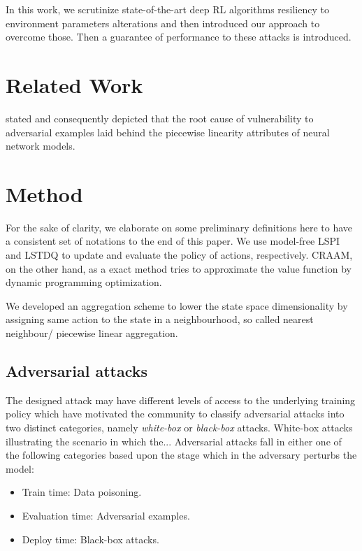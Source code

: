 \documentclass{article}
\begin{document}
    In this work, we scrutinize state-of-the-art deep RL algorithms resiliency to environment parameters alterations
    and then introduced our approach to overcome those. Then a guarantee of performance to these attacks is introduced.


    \section{Related Work}
    \cite{Goodfellow2014} stated and consequently depicted that the root cause of vulnerability to adversarial
    examples laid behind the piecewise linearity attributes of neural network models.


    \section{Method}
    For the sake of clarity, we elaborate on some preliminary definitions here to have a consistent set of notations
    to the end of this paper. We use model-free LSPI and LSTDQ \citep{Lagoudakis2003} to update and
    evaluate the policy of actions, respectively. CRAAM, on the other hand, as a exact method tries to approximate
    the value function by dynamic programming optimization.

    We developed an aggregation scheme to lower the state space dimensionality by assigning same action to the state
    in a neighbourhood, so called nearest neighbour/ piecewise linear aggregation.


    \subsection{Adversarial attacks}
    The designed attack may have different levels of access to the underlying training policy which have motivated
    the community to classify adversarial attacks into two distinct categories, namely \textit{white-box} or
    \textit{black-box} attacks. White-box attacks illustrating the scenario in which the... Adversarial attacks fall
    in either one of the following categories based upon the stage which in the adversary perturbs the model:
    \begin{itemize}
        \item Train time: Data poisoning.
        \item Evaluation time: Adversarial examples.
        \item Deploy time: Black-box attacks.
    \end{itemize}
\end{document}
